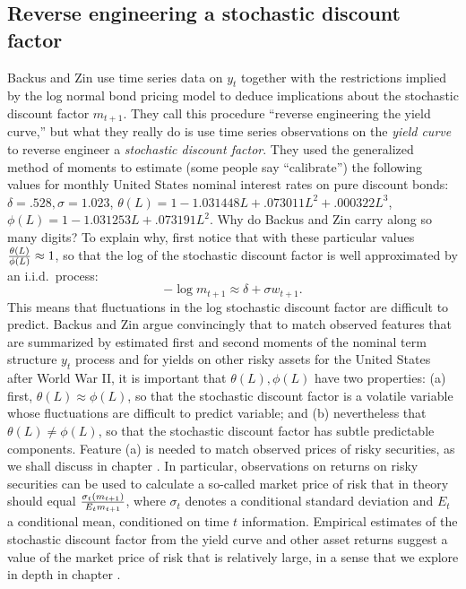 \subsection{Reverse engineering a stochastic discount factor}
Backus and Zin use time series data on $y_t$ together with
the restrictions implied by the log normal bond pricing
model  to deduce implications about the
stochastic discount factor $m_{t+1}$. They call this procedure
``reverse engineering the yield curve,'' but what they really do is
use time series observations on the {\it yield curve\/} to
reverse engineer a {\it stochastic discount factor\/}.
They used the generalized method of moments
 to estimate (some people say ``calibrate'')
the following values for monthly United States nominal interest rates
on pure discount bonds:
$ \delta=.528, \sigma=1.023$,
$\theta(L) = 1 -1.031448L + .073011L^2  + .000322L^3 $,
$\phi(L)=1-1.031253L +.073191L^2$.
Why do Backus and Zin carry along
so many digits? To explain why, first notice
that with these particular values ${\theta(L)  \over \phi(L)} \approx 1$, so that
the log of the stochastic discount factor is well approximated by
an i.i.d.\ process:
$$ -\log m_{t+1} \approx \delta + \sigma w_{t+1}. $$
This means that fluctuations in the log stochastic discount factor are
difficult to predict.
Backus and Zin argue convincingly that  to match observed
features that are summarized   by estimated first and second moments of the
nominal term structure $y_t$ process and for yields on other risky
assets for the United States after World War II,
it is important that $\theta(L), \phi(L)$
have two properties: (a) first, $\theta(L) \approx \phi(L)$, so that
the stochastic discount factor is a volatile variable whose fluctuations are
difficult to predict
variable; and (b) nevertheless that $\theta(L) \neq \phi(L)$, so that
the stochastic discount factor has subtle predictable components.
 Feature (a) is needed to match observed prices of risky securities, as we
shall discuss in chapter .  In particular, observations
on returns on risky securities can be used to calculate  a
so-called market price of risk  that in theory should equal
${\sigma_t(m_{t+1})\over E_t m_{t+1}}$, where $\sigma_t$ denotes
a conditional standard deviation and $E_t$ a conditional mean, conditioned
on time $t$ information.  Empirical estimates of the stochastic discount factor
from the yield curve and other asset returns suggest a value of
the market price of risk that is relatively large,
in a sense that we explore in depth in chapter .
